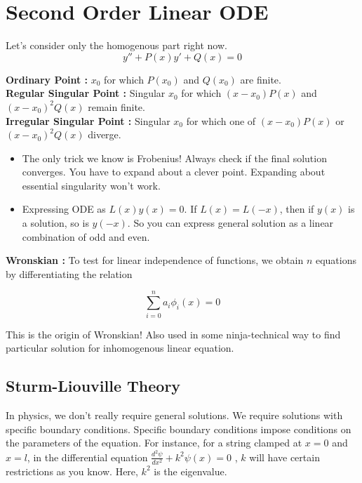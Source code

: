 \documentclass{report}
\begin{document}
\section{Second Order Linear ODE}
Let's consider only the homogenous part right now.
  $$y'' + P(x)y' + Q(x) = 0$$

\noindent \textbf{Ordinary Point :} $x_0$ for which $P(x_0)$ and $Q(x_0)$ are finite.\\

\noindent \textbf{Regular Singular Point :} Singular $x_0$ for which $(x-x_0)P(x)$ and $(x-x_0)^2 Q(x)$ remain finite.\\

\noindent \textbf{Irregular Singular Point :} Singular $x_0$ for which one of $(x-x_0)P(x)$ or $(x-x_0)^2 Q(x)$ diverge.\\

\begin{itemize}
  \item The only trick we know is Frobenius! Always check if the final solution converges. You have to expand about a clever point. Expanding about essential singularity won't work.\\

  \item Expressing ODE as $L(x)y(x) = 0$. If $L(x) = L(-x)$, then if $y(x)$ is a solution, so is $y(-x)$. So you can express general solution as a linear combination of odd and even.
\end{itemize}

\noindent \textbf{Wronskian :} To test for linear independence of functions, we obtain $n$ equations by differentiating the relation 

$$\sum_{i=0}^{n}a_i \phi_i (x) = 0$$

\noindent This is the origin of Wronskian! Also used in some ninja-technical way to find particular solution for inhomogenous linear equation.

\subsection{Sturm-Liouville Theory}

In physics, we don't really require general solutions. We require solutions with specific boundary conditions. Specific boundary conditions impose conditions on the parameters of the equation. For instance, for a string clamped at $x=0$ and $x=l$, in the differential equation $\frac{d^2\psi}{dx^2} + k^2\psi(x) = 0$ , $k$ will have certain restrictions as you know. Here, $k^2$ is the eigenvalue.\\
\end{document}
